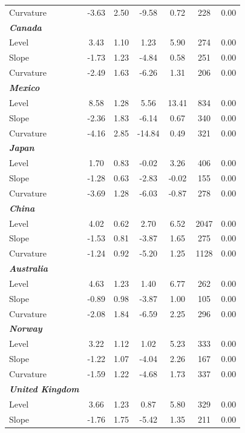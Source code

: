 \documentclass[12pt,bibliography=totoc]{article}
\begin{document}
\begin{table}[H]
\begin{tabular}{l c c c c c c}
Curvature					&	-3.63	&	2.50	&	-9.58	&	0.72	&	228	&	0.00	\\
\textit{\textbf{Canada}}				&		&		&		&		&		&		\\
Level						&	3.43	&	1.10	&	1.23	&	5.90	&	274	&	0.00	\\
Slope				&	-1.73	&	1.23	&	-4.84	&	0.58	&	251	&	0.00	\\
													
Curvature					&	-2.49	&	1.63	&	-6.26	&	1.31	&	206	&	0.00	\\
\textit{\textbf{Mexico}}			&		&		&		&		&		&		\\
Level						&	8.58	&	1.28	&	5.56	&	13.41&	834	&	0.00	\\
Slope				&	-2.36	&	1.83	&	-6.14	&	0.67	&	340	&	0.00	\\												
Curvature					&	-4.16	&	2.85&	-14.84&	0.49	&	321	&	0.00	\\
\textit{\textbf{Japan}}				&		&		&		&		&		&		\\
Level						&	1.70	&	0.83	&	-0.02	&	3.26	&	406	&	0.00	\\
Slope				&	-1.28	&	0.63	&	-2.83	&	-0.02	&	155	&	0.00	\\
													
Curvature					&	-3.69	&	1.28	&	-6.03	&	-0.87	&	278	&	0.00	\\
\textit{\textbf{China}}				&		&		&		&		&		&		\\
Level						&	4.02	&	0.62	&	2.70	&	6.52 &	2047	&	0.00	\\
Slope				&	-1.53	&	0.81	&	-3.87	&	1.65 &	275	&	0.00	\\
													
Curvature					&	-1.24	&	0.92	&	-5.20	&	1.25&	1128	&	0.00	\\
\textit{\textbf{Australia}}		&		&		&		&		&		&		\\
Level						&	4.63	&	1.23	&	1.40	&	6.77	&	262	&	0.00	\\
Slope				&	-0.89	&	0.98	&	-3.87	&	1.00	&	105	&	0.00	\\
													
Curvature					&	-2.08	&	1.84	&	-6.59	&	2.25	&	296	&	0.00	\\
\textit{\textbf{Norway}}				&		&		&		&		&		&		\\
Level						&	3.22	&	1.12	&	1.02	&	5.23	&	333	&	0.00	\\
Slope				&	-1.22	&	1.07	&	-4.04	&	2.26	&	167	&	0.00	\\
													
Curvature					&	-1.59	&	1.22	&	-4.68	&	1.73	&	337	&	0.00	\\
\textit{\textbf{United Kingdom}}		&		&		&		&		&		&		\\
Level						&	3.66	&	1.23	&	0.87	&	5.80	&	329	&	0.00	\\
Slope				&	-1.76	&	1.75	&	-5.42	&	1.35	&	211	&	0.00	\\
													

\end{tabular}
\end{table}
\end{document}
